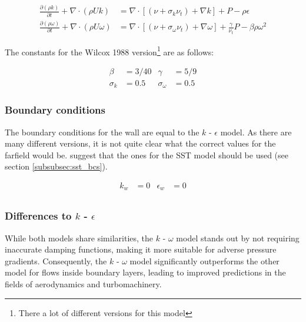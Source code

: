\begin{align}
    \label{eq:transport_k_omega}
    \frac{\partial (\rho k)}{\partial t} + 
    \nabla \cdot (\rho U k) &=
    \nabla \cdot \left[ 
        \left( \nu + \sigma_k \nu_t \right) + \nabla k 
    \right] + P - \rho \epsilon \\
%
    \label{eq:tranport_epsilon_omega}
    \frac{\partial (\rho \omega)}{\partial t} + 
    \nabla \cdot (\rho U \omega) &=
    \nabla \cdot \left[ 
        \left( \nu + \sigma_{\omega} \nu_t \right) + \nabla  \omega
    \right] + \frac{\gamma}{\nu_t} P - \beta \rho \omega^2
\end{align}

\noindent The constants for the Wilcox 1988 version\footnote{There a lot of
different versions for this model} are as follows: \cite{nasatmr}

\begin{align*}
    \beta       &= 3/40     & \gamma            &= 5/9\\
    \sigma_k    &= 0.5      & \sigma_{\omega}   &= 0.5
\end{align*}


\subsubsection{Boundary conditions}
The boundary conditions for the wall are equal to the $k$ - $\epsilon$ model.
As there are many different versions, it is not quite clear what the correct
values for the farfield would be. \cite{nasatmr} suggest that the ones for the
SST model should be used (see section \ref{subsubsec:sst_bcs}).
\cite{cfd101_k-omega}

\begin{align*}
    k_{w}        &= 0           &\epsilon_{w}       &= 0 \\
\end{align*}


\subsubsection{Differences to $k$ - $\epsilon$}
While both models share similarities, the $k$ - $\omega$ model stands out by
not requiring inaccurate damping functions, making it more suitable for adverse
pressure gradients. Consequently, the $k$ - $\omega$ model significantly
outperforms the other model for flows inside boundary layers, leading to
improved predictions in the fields of aerodynamics and turbomachinery.


